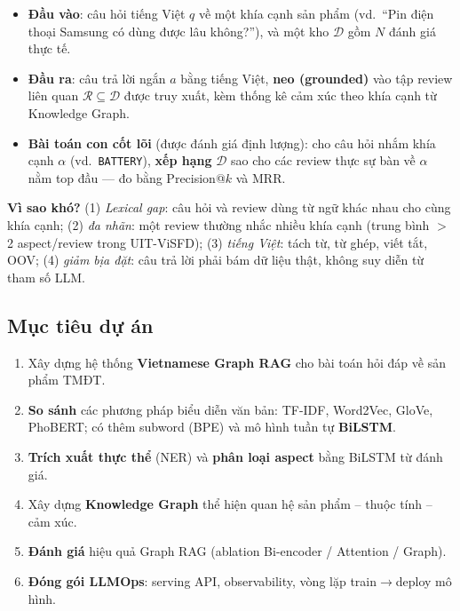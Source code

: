 \documentclass[12pt,a4paper]{article}
\begin{document}
\begin{itemize}[leftmargin=1.6cm,itemsep=1pt]
  \item \textbf{Đầu vào}: câu hỏi tiếng Việt $q$ về một khía cạnh sản phẩm (vd.\ ``Pin điện thoại Samsung có dùng được lâu không?''), và một kho $\mathcal{D}$ gồm $N$ đánh giá thực tế.
  \item \textbf{Đầu ra}: câu trả lời ngắn $a$ bằng tiếng Việt, \textbf{neo (grounded)} vào tập review liên quan $\mathcal{R}\subseteq\mathcal{D}$ được truy xuất, kèm thống kê cảm xúc theo khía cạnh từ Knowledge Graph.
  \item \textbf{Bài toán con cốt lõi} (được đánh giá định lượng): cho câu hỏi nhắm khía cạnh $\alpha$ (vd.\ \texttt{BATTERY}), \textbf{xếp hạng} $\mathcal{D}$ sao cho các review thực sự bàn về $\alpha$ nằm top đầu --- đo bằng Precision@$k$ và MRR.
\end{itemize}

\noindent\textbf{Vì sao khó?} (1) \textit{Lexical gap}: câu hỏi và review dùng từ ngữ khác nhau cho cùng khía cạnh; (2) \textit{đa nhãn}: một review thường nhắc nhiều khía cạnh (trung bình $>$2 aspect/review trong UIT-ViSFD); (3) \textit{tiếng Việt}: tách từ, từ ghép, viết tắt, OOV; (4) \textit{giảm bịa đặt}: câu trả lời phải bám dữ liệu thật, không suy diễn từ tham số LLM.

\subsection{Mục tiêu dự án}

\begin{enumerate}[leftmargin=2cm]
  \item Xây dựng hệ thống \textbf{Vietnamese Graph RAG} cho bài toán hỏi đáp về sản phẩm TMĐT.
  \item \textbf{So sánh} các phương pháp biểu diễn văn bản: TF-IDF, Word2Vec, GloVe, PhoBERT; có thêm subword (BPE) và mô hình tuần tự \textbf{BiLSTM}.
  \item \textbf{Trích xuất thực thể} (NER) và \textbf{phân loại aspect} bằng BiLSTM từ đánh giá.
  \item Xây dựng \textbf{Knowledge Graph} thể hiện quan hệ sản phẩm -- thuộc tính -- cảm xúc.
  \item \textbf{Đánh giá} hiệu quả Graph RAG (ablation Bi-encoder / Attention / Graph).
  \item \textbf{Đóng gói LLMOps}: serving API, observability, vòng lặp train$\to$deploy mô hình.
\end{enumerate}
\end{document}
